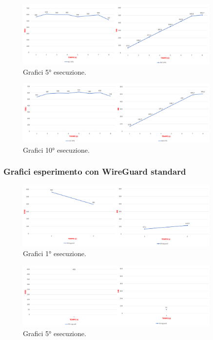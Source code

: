\begin{figure}[h] \includegraphics[width=0.9\textwidth] {Tesi magistrale/capitoli/images/2.png}
\centering
\caption{Grafici 5° esecuzione.}
\end{figure}

\begin{figure}[h] \includegraphics[width=0.9\textwidth] {Tesi magistrale/capitoli/images/3.png}
\centering
\caption{Grafici 10° esecuzione.}
\end{figure}

\newpage
\subsubsection{Grafici esperimento con WireGuard standard}

\begin{figure}[h] \includegraphics[width=0.9\textwidth] {Tesi magistrale/capitoli/images/4.png}
\centering
\caption{Grafici 1° esecuzione.}
\end{figure}

\begin{figure}[h] \includegraphics[width=0.9\textwidth] {Tesi magistrale/capitoli/images/5.png}
\centering
\caption{Grafici 5° esecuzione.}
\end{figure}

